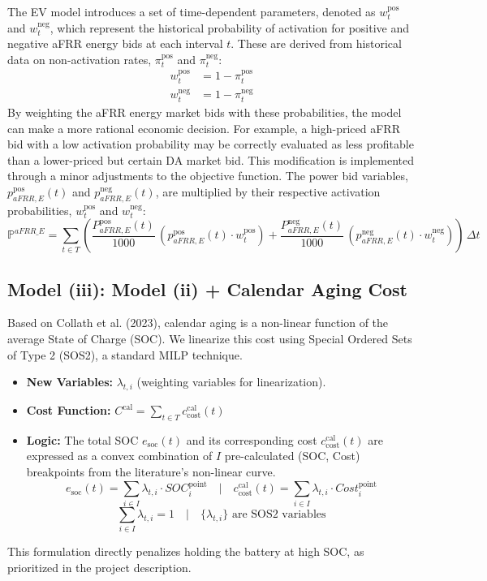 \documentclass[11pt, a4paper]{article}
\begin{document}
The EV model introduces a set of time-dependent parameters, denoted as $w^{\mathrm{pos}}_t$ and $w^{\mathrm{neg}}_t$, which represent the historical probability of activation for positive and negative aFRR energy bids at each interval $t$. These are derived from historical data on non-activation rates, $\pi^{\mathrm{pos}}_t$ and $\pi^{\mathrm{neg}}_t$:
\begin{align}
    w^{\mathrm{pos}}_t &= 1 - \pi^{\mathrm{pos}}_t \\
    w^{\mathrm{neg}}_t &= 1 - \pi^{\mathrm{neg}}_t
\end{align}
By weighting the aFRR energy market bids with these probabilities, the model can make a more rational economic decision. For example, a high-priced aFRR bid with a low activation probability may be correctly evaluated as less profitable than a lower-priced but certain DA market bid. This modification is implemented through a minor adjustments to the objective function. The power bid variables, $p^{\mathrm{pos}}_{aFRR,E}(t)$ and $p^{\mathrm{neg}}_{aFRR,E}(t)$, are multiplied by their respective activation probabilities, $w^{\mathrm{pos}}_t$ and $w^{\mathrm{neg}}_t$:
\begin{equation}
\mathbb{P}^{aFRR\_E} = \sum_{t\in T} \left( \frac{P^{\mathrm{pos}}_{aFRR, E}(t)}{1000}\, (p^{\mathrm{pos}}_{aFRR, E}(t) \cdot w_t^{\mathrm{pos}}) + \frac{P^{\mathrm{neg}}_{aFRR, E}(t)}{1000}\, (p^{\mathrm{neg}}_{aFRR, E}(t) \cdot w_t^{\mathrm{neg}}) \right)\, \Delta t
\end{equation}



\subsection{Model (iii): Model (ii) + Calendar Aging Cost}
Based on Collath et al. (2023), calendar aging is a non-linear function of the average State of Charge (SOC). We linearize this cost using Special Ordered Sets of Type 2 (SOS2), a standard MILP technique.
\begin{itemize}
    \item \textbf{New Variables:} $\lambda_{t,i}$ (weighting variables for linearization).
    \item \textbf{Cost Function:} $C^{\mathrm{cal}} = \sum_{t \in T} c^{\mathrm{cal}}_{\mathrm{cost}}(t)$
    \item \textbf{Logic:} The total SOC $e_{\mathrm{soc}}(t)$ and its corresponding cost $c^{\mathrm{cal}}_{\mathrm{cost}}(t)$ are expressed as a convex combination of $I$ pre-calculated (SOC, Cost) breakpoints from the literature's non-linear curve.
    $$ e_{\mathrm{soc}}(t) = \sum_{i \in I} \lambda_{t,i} \cdot SOC^{\mathrm{point}}_i \quad | \quad c^{\mathrm{cal}}_{\mathrm{cost}}(t) = \sum_{i \in I} \lambda_{t,i} \cdot Cost^{\mathrm{point}}_i $$
    $$ \sum_{i \in I} \lambda_{t,i} = 1 \quad | \quad \{\lambda_{t,i}\} \text{ are SOS2 variables} $$
\end{itemize}
This formulation directly penalizes holding the battery at high SOC, as prioritized in the project description. 
\end{document}
